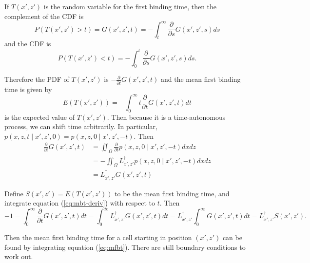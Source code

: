 \documentclass{article}
\newcommand{\dd}{d}
\newcommand{\Pder}[2]{\frac{\partial #1}{\partial #2}}
\newcommand{\Integral}[4]{\int_{#3}^{#4} {#1} \dd #2}
\begin{document}
If $T(x', z')$ is the random variable for the first binding time, then
the complement of the CDF is
\begin{equation}
  P(T(x', z') > t) = G(x', z', t) = -\Integral{\Pder{}{s} G(x', z',
    s)}{s}{t}{\infty}
  \label{eq:cdf-complement}
\end{equation}
and the CDF is 
\begin{equation}
  P(T(x', z') < t) = -\Integral{\Pder{}{s} G(x', z', s)}{s}{0}{t}.
  \label{eq:cdf}
\end{equation}

Therefore the PDF of $T(x', z')$ is $-\Pder{}{t} G(x', z', t)$ and the
mean first binding time is given by
\begin{equation}
  E(T(x', z')) = -\Integral{t \Pder{}{t} G(x', z', t)}{t}{0}{\infty}
  \label{eq:expect}
\end{equation}
is the expected value of $T(x', z')$. Then because it is a
time-autonomous process, we can shift time arbitrarily. In particular,
$p(x, z, t \mid x', z', 0) = p(x, z, 0 \mid x', z', -t)$. Then
\begin{align}
  \Pder{}{t} G(x', z', t) &= \iint_\Omega \Pder{}{t} p(x, z, 0 \mid x', z',
  -t) dx dz \\
  &= -\iint_\Omega L^\dag_{x', z'} p(x, z, 0 \mid x', z', -t) dx dz \\
  &= L^\dag_{x', z'} G(x', z', t)
  \label{eq:mbt-deriv}
\end{align}



Define $S(x', z') = E(T(x', z'))$ to be the mean first binding time,
and integrate equation (\ref{eq:mbt-deriv}) with respect to $t$. Then
\begin{equation}
  -1 = \Integral{\Pder{}{t}G(x', z', t)}{t}{0}{\infty}
  = \Integral{L^\dag_{x', z'} G(x', z', t)}{t}{0}{\infty}
  = L^\dag_{x', z'} \Integral{G(x', z', t)}{t}{0}{\infty}
  = L^\dag_{x', z'} S(x', z').
  \label{eq:mfbt}
\end{equation}

Then the mean first binding time for a cell starting in position $(x',
z')$ can be found by integrating equation (\ref{eq:mfbt}). There are
still boundary conditions to work out.
\end{document}
